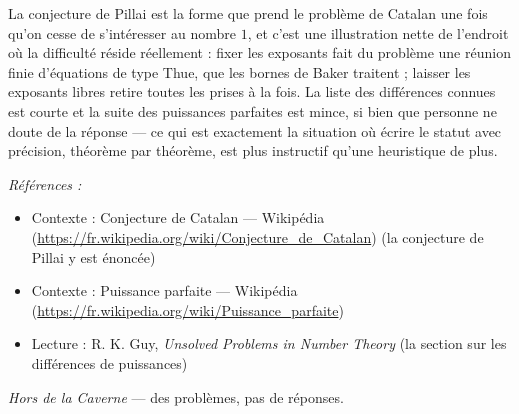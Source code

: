 \documentclass[11pt]{article}
\newenvironment{refs}{\par\small\noindent\emph{Références :}\begin{itemize}\setlength\itemsep{0pt}}{\end{itemize}\normalsize}
\begin{document}
\noindent La conjecture de Pillai est la forme que prend le problème de Catalan une fois
qu'on cesse de s'intéresser au nombre $ 1 $, et c'est une illustration nette de l'endroit où la
difficulté réside réellement : fixer les exposants fait du problème une réunion finie d'équations de
type Thue, que les bornes de Baker traitent ; laisser les exposants libres retire toutes les prises à
la fois. La liste des différences connues est courte et la suite des puissances parfaites est mince,
si bien que personne ne doute de la réponse --- ce qui est exactement la situation où écrire le statut
avec précision, théorème par théorème, est plus instructif qu'une heuristique de plus.

\begin{refs}
\item Contexte : Conjecture de Catalan --- Wikipédia (\url{https://fr.wikipedia.org/wiki/Conjecture_de_Catalan}) (la conjecture de Pillai y est énoncée)
\item Contexte : Puissance parfaite --- Wikipédia (\url{https://fr.wikipedia.org/wiki/Puissance_parfaite})
\item Lecture : R. K. Guy, \textit{Unsolved Problems in Number Theory} (la section sur les différences de puissances)
\end{refs}

\bigskip


\vfill
\noindent\emph{Hors de la Caverne} --- des probl\`emes, pas de r\'eponses.
\end{document}
